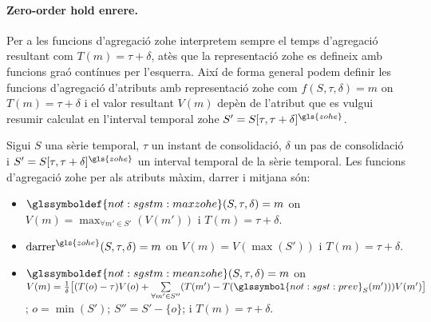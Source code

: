 \paragraph{Zero-order hold enrere.}
Per a les funcions d'agregació \gls{zohe} interpretem sempre el temps
d'agregació resultant com $T(m)=\tau+\delta$, atès que la
representació \gls{zohe} es defineix amb funcions graó contínues per
l'esquerra. Així de forma general podem definir les funcions
d'agregació d'atributs amb representació \gls{zohe} com
$f(S,\tau,\delta)=m$ on $T(m)=\tau+\delta$ i el valor resultant $V(m)$
depèn de l'atribut que es vulgui resumir calculat en l'interval
temporal \gls{zohe} $S'=S[\tau,\tau+\delta]^{\gls{zohe}}$.
\begin{definition}
  \label{def:sgstm:agregadorszohe}
  Sigui $S$ una sèrie temporal, $\tau$ un instant de consolidació,
  $\delta$ un pas de consolidació i $S'=S[\tau,\tau+\delta]^{\gls{zohe}}$ un
  interval temporal de la sèrie temporal. Les funcions d'agregació \gls{zohe}
  per als atributs màxim, darrer i mitjana són:
  \begin{itemize}
  \item $\glssymboldef{not:sgstm:maxzohe}(S,\tau,\delta)=m$ on
    $V(m) = \max_{\forall m' \in S'}(V(m'))$ i $T(m)=\tau+\delta$.

  \item $\operatorname{darrer}^{\gls{zohe}}(S,\tau,\delta)=m$ on $V(m) = V(\max(S'))$ i $T(m)=\tau+\delta$.

  \item $\glssymboldef{not:sgstm:meanzohe}(S,\tau,\delta)=m$ on
    $V(m) = \frac{1}{\delta} \big[ (T(o)-\tau)V(o) +
    \sum\limits_{\forall m' \in S''}( T(m')-
    T(\glssymbol{not:sgst:prev}_S (m')) )V(m') \big]$; $o=\min(S')$;
    $S''= S' - \{o\}$; i $T(m)=\tau+\delta$.  \label{def:sgstm:meanzohe}
  \end{itemize}
\end{definition}




